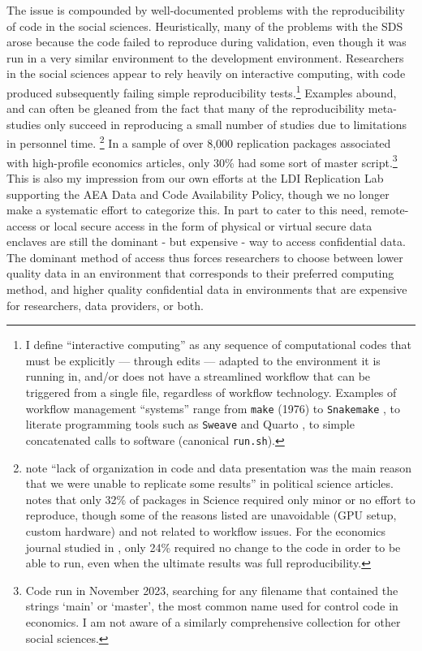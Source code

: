 \documentclass[]{hdsr}
\begin{document}
The issue is compounded by well-documented problems with the reproducibility of code in the social sciences. Heuristically, many of the problems with the SDS arose because the code failed to reproduce during validation, even though it was  run in a very similar environment to the development environment. Researchers in the social sciences appear to rely heavily on interactive computing, with code produced subsequently failing simple reproducibility tests.\footnote{I define ``interactive computing'' as any sequence of computational codes that must be explicitly --- through edits --- adapted to the environment it is running in, and/or does not have a streamlined workflow that can be triggered from a single file, regardless of workflow technology. Examples of workflow management ``systems'' range from \texttt{make} (1976) \citep{association_for_computing_machinery_acm_2003} to \texttt{Snakemake} \citep{molder_sustainable_2021}, to literate programming tools such as \texttt{Sweave} \citep{Leisch2002SweaveDG} and Quarto \citep{Allaire_Quarto_2024}, to simple concatenated calls to software (canonical \texttt{run.sh}). } Examples abound, and can often be gleaned from the fact that many of the reproducibility meta-studies only succeed in reproducing a small number of studies due to limitations in personnel time.%
\footnote{\citet{stockemer_data_2018} note ``lack of organization in code and data presentation was the main reason that we were unable to replicate some results'' in political science articles. \citet{StoddenPNAS2018} notes that only 32\% of packages in Science required only minor or no effort to reproduce, though some of the reasons listed are unavoidable (GPU setup, custom hardware) and not related to workflow issues. For the economics journal studied in \citet{herbert_reproduce_2024}, only 24\% required no change to the code in order to be able to run, even when the ultimate results was full reproducibility.}
%
In a sample of over 8,000 replication packages associated with high-profile economics articles, only 30\% had some sort of master script.\footnote{Code run in November 2023, searching for any filename that contained the strings `main' or `master', the most common name used for control code in economics. I am not aware of a similarly comprehensive collection for other social sciences.} This is also my impression from our own efforts at the LDI Replication Lab supporting the AEA Data and Code Availability Policy, though we no longer make a systematic effort to categorize this.  In part to cater to this need, remote-access or local secure access in the form of physical or virtual secure data enclaves are still the dominant - but expensive - way to access confidential data. The dominant method of access thus forces researchers to choose between lower quality data in an environment that corresponds to their preferred computing method, and higher quality confidential data in environments that are expensive for researchers, data providers, or both.
\end{document}
